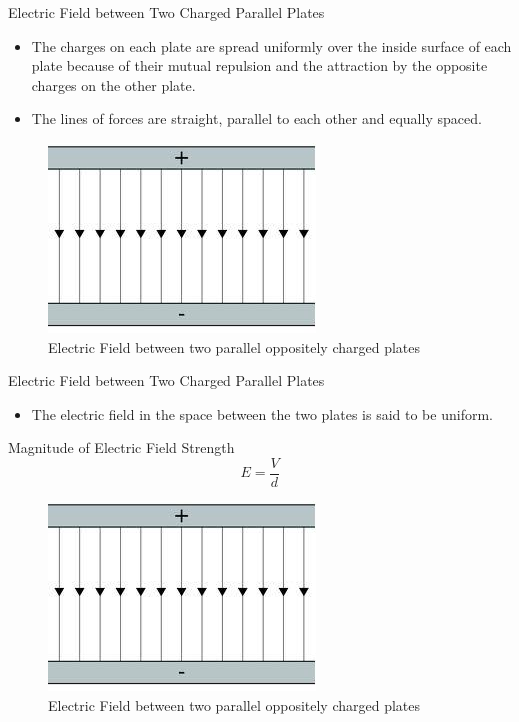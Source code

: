 \documentclass{beamer}
\begin{document}
\begin{frame}{Electric Field between Two Charged Parallel Plates}{}
  \begin{itemize}
	\item The charges on each plate are spread uniformly over the inside surface of each plate because of their mutual repulsion and the attraction by the opposite charges on the other plate.
	\item The lines of forces are straight, parallel to each other and equally spaced.
  \end{itemize}
\begin{figure}
\includegraphics[scale=0.4]{parallelplates}
\caption{Electric Field between two parallel oppositely charged plates}
\end{figure}
\end{frame}

\begin{frame}{Electric Field between Two Charged Parallel Plates}{}
  \begin{itemize}
	\item The electric field in the space between the two plates is said to be uniform.
  \end{itemize}
  \begin{block}{Magnitude of Electric Field Strength}
\[E=\frac{V}{d}\]
\end{block}
\begin{figure}
\includegraphics[scale=0.4]{parallelplates}
\caption{Electric Field between two parallel oppositely charged plates}
\end{figure}
\end{frame}
\end{document}
